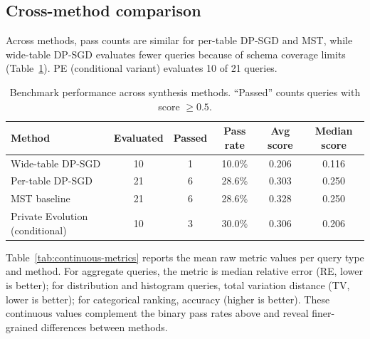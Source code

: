 \documentclass[12pt,letterpaper]{article}
\renewcommand{\_}{\textunderscore\allowbreak}
\begin{document}
\subsection{Cross-method comparison}

Across methods, pass counts are similar for per-table DP-SGD and MST, while wide-table DP-SGD evaluates fewer queries because of schema coverage limits (Table~\ref{tab:method-comparison}). PE (conditional variant) evaluates 10 of 21 queries.

\begin{table}[H]
\centering
\begin{tabular*}{\textwidth}{@{\extracolsep{\fill}}lccccc}
\toprule
\textbf{Method} & \textbf{Evaluated} & \textbf{Passed} & \textbf{Pass rate} & \textbf{Avg score} & \textbf{Median score} \\
\midrule
Wide-table DP-SGD & 10 & 1 & 10.0\% & 0.206 & 0.116 \\
Per-table DP-SGD & 21 & 6 & 28.6\% & 0.303 & 0.250 \\
MST baseline & 21 & 6 & 28.6\% & 0.328 & 0.250 \\
Private Evolution (conditional) & 10 & 3 & 30.0\% & 0.306 & 0.206 \\
\bottomrule
\end{tabular*}
\caption{Benchmark performance across synthesis methods. ``Passed'' counts queries with score $\geq 0.5$.}
\label{tab:method-comparison}
\end{table}

Table~\ref{tab:continuous-metrics} reports the mean raw metric values per query type and method. For aggregate queries, the metric is median relative error (RE, lower is better); for distribution and histogram queries, total variation distance (TV, lower is better); for categorical ranking, accuracy (higher is better). These continuous values complement the binary pass rates above and reveal finer-grained differences between methods.
\end{document}
